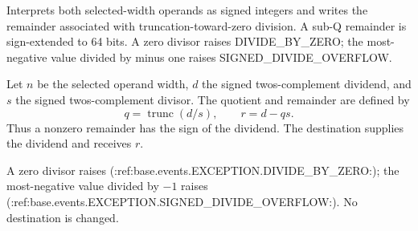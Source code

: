 Interprets both selected-width operands as signed integers and writes the remainder associated with truncation-toward-zero division. A sub-Q remainder is sign-extended to 64 bits. A zero divisor raises DIVIDE\_BY\_ZERO; the most-negative value divided by minus one raises SIGNED\_DIVIDE\_OVERFLOW.

Let \(n\) be the selected operand width, \(d\) the signed two\textquotesingle{}s-complement dividend, and \(s\) the signed two\textquotesingle{}s-complement divisor. The quotient and remainder are defined by
\[
  q = \operatorname{trunc}(d/s),
  \qquad r = d - qs .
\]
Thus a nonzero remainder has the sign of the dividend. The destination supplies the dividend and receives \(r\).

A zero divisor raises (:ref:base.events.EXCEPTION.DIVIDE_BY_ZERO:); the most-negative value divided by \(-1\) raises (:ref:base.events.EXCEPTION.SIGNED_DIVIDE_OVERFLOW:). No destination is changed.
